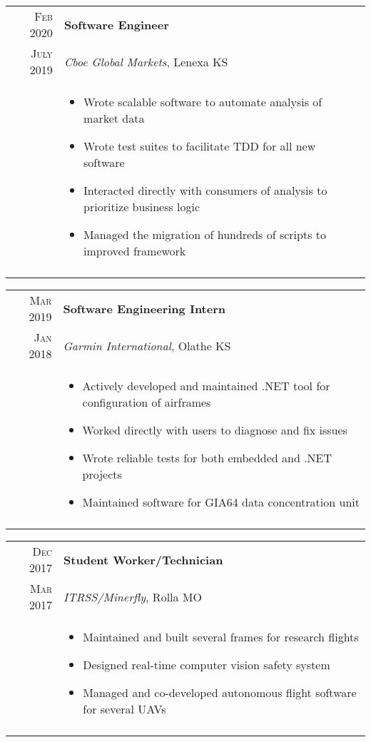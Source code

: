 \documentclass[a4paper,10pt]{article}
\newcommand{\br}{\\\multicolumn{2}{c}{}}
\begin{document}
\begin{tabular}{r|p{15cm}}
    \textsc{Feb 2020} & \textbf{Software Engineer} \\
    \textsc{July 2019}  & \textit{Cboe Global Markets}, Lenexa KS \\ &
    \begin{itemize}
    \item Wrote scalable software to automate analysis of market data
    \item Wrote test suites to facilitate TDD for all new software
    \item Interacted directly with consumers of analysis to prioritize business logic
    \item Managed the migration of hundreds of scripts to improved framework

    \end{itemize} \br\\

\end{tabular}

\begin{tabular}{r|p{15cm}}
    \textsc{Mar 2019} & \textbf{Software Engineering Intern} \\
    \textsc{Jan 2018} & \textit{Garmin International}, Olathe KS \\ &
    \begin{itemize}
    \item Actively developed and maintained .NET tool for configuration of airframes
    \item Worked directly with users to diagnose and fix issues
    \item Wrote reliable tests for both embedded and .NET projects
    \item Maintained software for GIA64 data concentration unit

    \end{itemize} \br\\

\end{tabular}

\begin{tabular}{r|p{15cm}}
    \textsc{Dec 2017} & \textbf{Student Worker/Technician} \\
    \textsc{Mar 2017} & \textit{ITRSS/Minerfly}, Rolla MO \\ &
    \begin{itemize}
    \item Maintained and built several frames for research flights
    \item Designed real-time computer vision safety system
    \item Managed and co-developed autonomous flight software for several UAVs

    \end{itemize} \br\\

\end{tabular}
\end{document}
